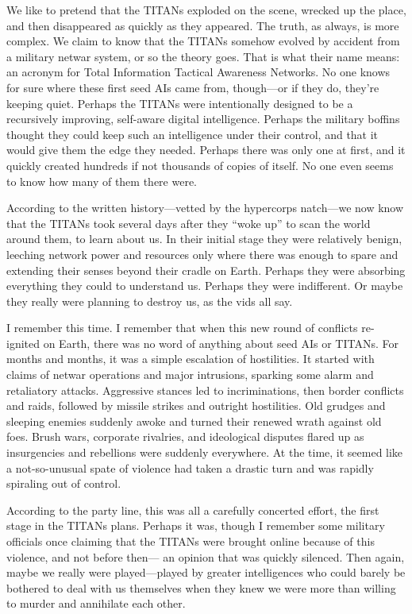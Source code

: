 We like to pretend that the TITANs exploded on the scene, wrecked up
the place, and then disappeared as quickly as they appeared. The
truth, as always, is more complex. We claim to know that the TITANs
somehow evolved by accident from a military netwar system, or so the
theory goes. That is what their name means: an acronym for Total
Information Tactical Awareness Networks. No one knows for sure where
these first seed AIs came from, though—or if they do, they're keeping
quiet. Perhaps the TITANs were intentionally designed to be a
recursively improving, self-aware digital intelligence. Perhaps the
military boffins thought they could keep such an intelligence under
their control, and that it would give them the edge they
needed. Perhaps there was only one at first, and it quickly created
hundreds if not thousands of copies of itself. No one even seems to
know how many of them there were.

According to the written history—vetted by the hypercorps natch—we now
know that the TITANs took several days after they “woke up” to scan
the world around them, to learn about us. In their initial stage they
were relatively benign, leeching network power and resources only
where there was enough to spare and extending their senses beyond
their cradle on Earth. Perhaps they were absorbing everything they
could to understand us. Perhaps they were indifferent.  Or maybe they
really were planning to destroy us, as the vids all say.

I remember this time. I remember that when this new round of conflicts
re-ignited on Earth, there was no word of anything about seed AIs or
TITANs.  For months and months, it was a simple escalation of
hostilities. It started with claims of netwar operations and major
intrusions, sparking some alarm and retaliatory attacks. Aggressive
stances led to incriminations, then border conflicts and raids,
followed by missile strikes and outright hostilities. Old grudges and
sleeping enemies suddenly awoke and turned their renewed wrath against
old foes. Brush wars, corporate rivalries, and ideological disputes
flared up as insurgencies and rebellions were suddenly everywhere. At
the time, it seemed like a not-so-unusual spate of violence had taken
a drastic turn and was rapidly spiraling out of control.

According to the party line, this was all a carefully concerted
effort, the first stage in the TITANs plans.  Perhaps it was, though I
remember some military officials once claiming that the TITANs were
brought online because of this violence, and not before then— an
opinion that was quickly silenced. Then again, maybe we really were
played—played by greater intelligences who could barely be bothered to
deal with us themselves when they knew we were more than willing to
murder and annihilate each other.

